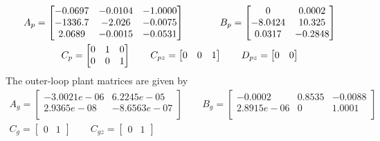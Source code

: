 \begin{equation*}
  \begin{gathered}
    A_{p}=
    \begin{bmatrix}
      -0.0697 & -0.0104 & -1.0000 \\
      -1336.7 & -2.026 & -0.0075 \\
      2.0689 & -0.0015 & -0.0531 \\
    \end{bmatrix}
    \hspace{0.5in}
    B_{p}=
    \begin{bmatrix}
      0 & 0.0002 \\
      -8.0424 & 10.325 \\
      0.0317 & -0.2848 \\
    \end{bmatrix} \\
    C_{p}=
    \begin{bmatrix}
      0 & 1 & 0 \\
      0 & 0 & 1 \\
    \end{bmatrix}
    \qquad
    C_{pz}=
    \begin{bmatrix}
      0 & 0 & 1
    \end{bmatrix}
    \qquad
    D_{pz} =
    \begin{bmatrix}
      0 & 0
    \end{bmatrix}
  \end{gathered}
\end{equation*}
The outer-loop plant matrices are given by
\begin{equation*}
  \begin{gathered}
    A_{g} =
    \begin{bmatrix}
      -3.0021e-06 & 6.2245e-05 \\
      2.9365e-08 & -8.6563e-07 \\
    \end{bmatrix}
    \qquad
    B_{g} =
    \begin{bmatrix}
      -0.0002 & 0.8535 & -0.0088 \\
      2.8915e-06 & 0 & 1.0001 \\
    \end{bmatrix} \\
    C_{g} =
    \begin{bmatrix}
      0 & 1
    \end{bmatrix}
    \qquad
    C_{gz} =
    \begin{bmatrix}
      0 & 1
    \end{bmatrix}
  \end{gathered}
\end{equation*}

